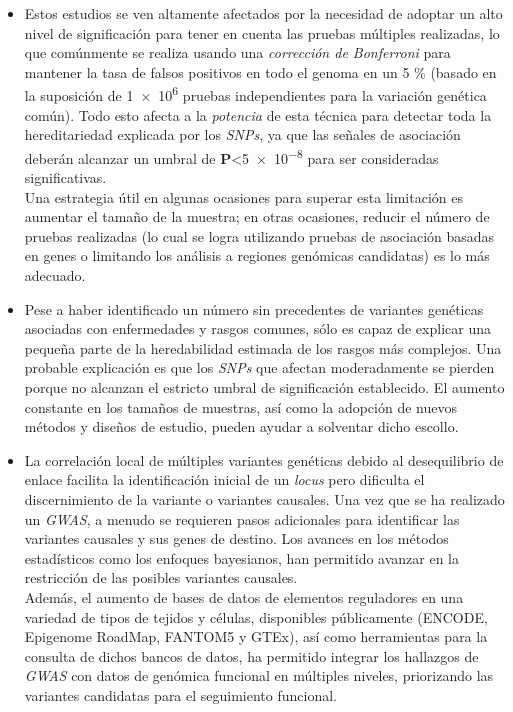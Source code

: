 \documentclass[IB,BIB]{TFUOC}%
\begin{document}
\begin{itemize}
    \item Estos estudios se ven altamente afectados por la necesidad de adoptar un alto nivel de significación para tener en cuenta las pruebas múltiples realizadas, lo que comúnmente se realiza usando una \textit{corrección de Bonferroni} para mantener la tasa de falsos positivos en todo el genoma en un 5 \% (basado en la suposición de \num{1e6} pruebas independientes para la variación genética común). Todo esto afecta a la \textit{potencia} de esta técnica para detectar toda la hereditariedad explicada por los \textit{SNPs}, ya que las señales de asociación deberán alcanzar un umbral de \textbf{P}<\num{5e-8} para ser consideradas significativas. \\
Una estrategia útil en algunas ocasiones para superar esta limitación es aumentar el tamaño de la muestra; en otras ocasiones, reducir el número de pruebas realizadas (lo cual se logra utilizando pruebas de asociación basadas en genes o limitando los análisis a regiones genómicas candidatas) es lo más adecuado.
    \item Pese a haber identificado un número sin precedentes de variantes genéticas asociadas con enfermedades y rasgos comunes, sólo es capaz de explicar una pequeña parte de la heredabilidad estimada de los rasgos más complejos. Una probable explicación es que los \textit{SNPs} que afectan moderadamente se pierden porque no alcanzan el estricto umbral de significación establecido. El aumento constante en los tamaños de muestras, así como la adopción de nuevos métodos y diseños de estudio, pueden ayudar a solventar dicho escollo.
    \item La correlación local de múltiples variantes genéticas debido al desequilibrio de enlace facilita la identificación inicial de un \textit{locus} pero dificulta el discernimiento de la variante o variantes causales. Una vez que se ha realizado un \textit{GWAS}, a menudo se requieren pasos adicionales para identificar las variantes causales y sus genes de destino. Los avances en los métodos estadísticos como los enfoques bayesianos, han permitido avanzar en la restricción de las posibles variantes causales. \\
    Además, el aumento de bases de datos de elementos reguladores en una variedad de tipos de tejidos y células, disponibles públicamente  (ENCODE, Epigenome RoadMap, FANTOM5 y GTEx), así como herramientas para la consulta de dichos bancos de datos, ha permitido integrar los hallazgos de \textit{GWAS} con datos de genómica funcional en múltiples niveles, priorizando las variantes candidatas para el seguimiento funcional.

\end{itemize}
\end{document}
